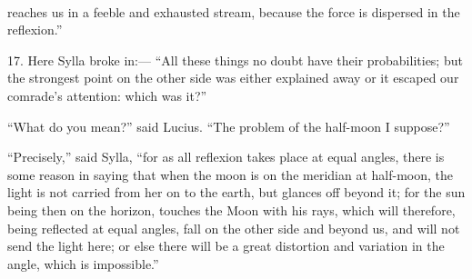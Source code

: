 \documentclass[a4paper, 11pt, oneside, polutonikogreek, english]{article}
\begin{document}
\paragraph{}
reaches us in a feeble and exhausted stream, because the force is dispersed in the reflexion.''

17. Here Sylla broke in:--- ``All these things no doubt have their probabilities; but the strongest point on the other side was either explained away or it escaped our comrade's attention: which was it?''

``What do you mean?'' said Lucius. ``The problem of the half-moon I suppose?''

``Precisely,'' said Sylla, ``for as all reflexion takes place at equal angles, there is some reason in saying that when the moon is on the meridian at half-moon, the light is not carried from her on to the earth, but glances off beyond it; for the sun being then on the horizon, touches the Moon with his rays, which will therefore, being reflected at equal angles, fall on the other side and beyond us, and will not send the light here; or else there will be a great distortion and variation in the angle, which is impossible.''
\end{document}
